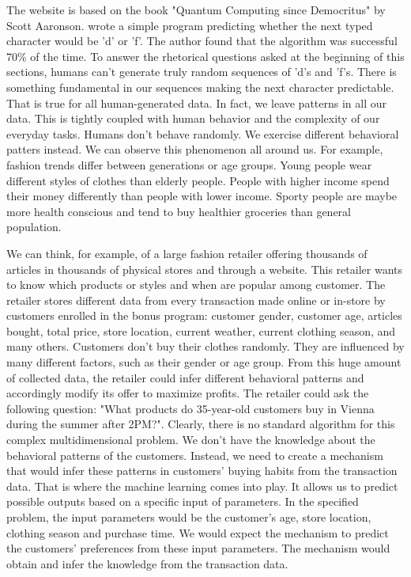 \documentclass{BachelorBUI}
\begin{document}
        The website is based on the book "Quantum Computing since Democritus" by Scott Aaronson. \textcite{Aaronson:2013} wrote a simple program predicting whether the next typed character would be 'd' or 'f'. The author found that the algorithm was successful 70\% of the time. To answer the rhetorical questions asked at the beginning of this sections, humans can't generate truly random sequences of 'd's and 'f's. There is something fundamental in our sequences making the next character predictable. That is true for all human-generated data. In fact, we leave patterns in all our data. This is tightly coupled with human behavior and the complexity of our everyday tasks. Humans don't behave randomly. We exercise different behavioral patters instead. We can observe this phenomenon all around us. For example, fashion trends differ between generations or age groups. Young people wear different styles of clothes than elderly people. People with higher income spend their money differently than people with lower income. Sporty people are maybe more health conscious and tend to buy healthier groceries than general population.

        We can think, for example, of a large fashion retailer offering thousands of articles in thousands of physical stores and through a website. This retailer wants to know which products or styles and when are popular among customer. The retailer stores different data from every transaction made online or in-store by customers enrolled in the bonus program: customer gender, customer age, articles bought, total price, store location, current weather, current clothing season, and many others. Customers don't buy their clothes randomly. They are influenced by many different factors, such as their gender or age group. From this huge amount of collected data, the retailer could infer different behavioral patterns and accordingly modify its offer to maximize profits. The retailer could ask the following question: "What products do 35-year-old customers buy in Vienna during the summer after 2PM?". Clearly, there is no standard algorithm for this complex multidimensional problem. We don't have the knowledge about the behavioral patterns of the customers. Instead, we need to create a mechanism that would infer these patterns in customers' buying habits from the transaction data. That is where the machine learning comes into play. It allows us to predict possible outputs based on a specific input of parameters. In the specified problem, the input parameters would be the customer's age, store location, clothing season and purchase time. We would expect the mechanism to predict the customers' preferences from these input parameters. The mechanism would obtain and infer the knowledge from the transaction data.
\end{document}
